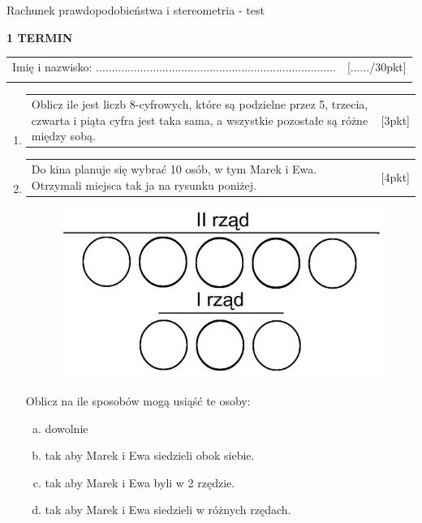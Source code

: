 \documentclass[12pt,a4paper]{article}
\begin{document}
	\begin{center}
		\LARGE Rachunek prawdopodobieństwa i stereometria - test
	\end{center}
	\vspace{1.5cm}
	\begin{flushright}
		\textbf{1 TERMIN}
	\end{flushright}
	\begin{tabular}{p{13cm} r}
		Imię i nazwisko: ............................................................................
		&[....../30pkt]\\ 
		\vspace{0.5cm}
	\end{tabular}
	\begin{enumerate}[1.]
		\item  \begin{tabular}{p{13cm} r}
			Oblicz ile jest liczb  8-cyfrowych, które są podzielne przez 5, trzecia, czwarta i piąta cyfra jest taka sama, a wszystkie pozostałe są różne między sobą.&[3pkt]\\ 
		\end{tabular}
		
		\item  \begin{tabular}{p{13cm} r}
			Do kina planuje się wybrać 10 osób, w tym Marek i Ewa. Otrzymali miejsca tak ja na rysunku poniżej.&[4pkt]\\ 
		\end{tabular}
		
		\begin{figure}[h]
			\centering
			\includegraphics[scale=0.4]{rpst1.jpeg}
		\end{figure}
		
		Oblicz na ile sposobów mogą usiąść te osoby:
		\begin{enumerate}[a)]
			\item dowolnie
			\item tak aby Marek i Ewa siedzieli obok siebie.
			\item tak aby Marek i Ewa byli w 2 rzędzie.
			\item tak aby Marek i Ewa siedzieli w różnych rzędach.
		\end{enumerate}
		

\end{enumerate}
\end{document}
